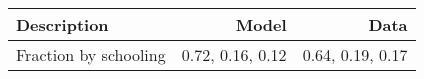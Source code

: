 \begin{tabular}{lrr}
\hline
Description & Model  & Data  \\
\hline
Fraction by schooling & 0.72, 0.16, 0.12  & 0.64, 0.19, 0.17  \\
\hline
\end{tabular}%
